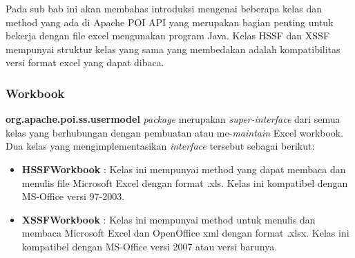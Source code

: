Pada sub bab ini akan membahas introduksi mengenai beberapa kelas dan method yang ada di Apache POI API yang merupakan bagian penting untuk bekerja dengan file excel mengunakan program Java. Kelas HSSF dan XSSF mempunyai struktur kelas yang sama yang membedakan adalah kompatibilitas versi format excel yang dapat dibaca. \cite{apachepoi2}

\subsubsection{Workbook}
\label{subs:workbook} 
\textbf{org.apache.poi.ss.usermodel} \textit{package} merupakan \textit{super-interface} dari semua kelas yang berhubungan dengan pembuatan atau me-\textit{maintain} Excel workbook. Dua kelas yang mengimplementasikan \textit{interface} tersebut sebagai berikut:\cite{apachepoi2}

\begin{itemize}
	\item \textbf{HSSFWorkbook} : Kelas ini mempunyai method yang dapat membaca dan menulis file Microsoft Excel dengan format .xls. Kelas ini kompatibel dengan MS-Office versi 97-2003.
	\item \textbf{XSSFWorkbook} : Kelas ini mempunyai method untuk menulis dan membaca Microsoft Excel dan OpenOffice xml dengan format .xlsx. Kelas ini kompatibel dengan MS-Office versi 2007 atau versi barunya.
\end{itemize}  

